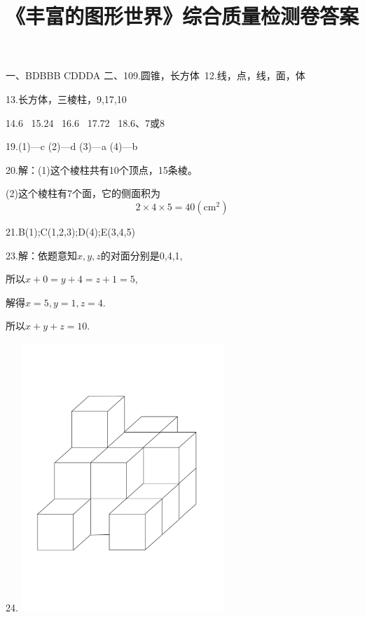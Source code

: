 \documentclass{beamer}
\begin{document}
\begin{frame}
\title{《丰富的图形世界》综合质量检测卷答案}
一、BDBBB  CDDDA
二、109.圆锥，长方体\ 
12.线，点，线，面，体

13.长方体，三棱柱，9,17,10

14.6 \ 15.24 \ 16.6 \ 17.72  \ 18.6、7或8

19.(1)---c (2)---d (3)---a (4)---b

20.解：(1)这个棱柱共有10个顶点，15条棱。

(2)这个棱柱有7个面，它的侧面积为\[2\times4\times5=40(\mathrm{cm}^2)\]

21.B(1);C(1,2,3);D(4);E(3,4,5)
\end{frame}


\begin{frame}
23.解：依题意知$x,y,z$的对面分别是0,4,1,

所以$x+0=y+4=z+1=5$,

解得$x=5,y=1,z=4$.

所以$x+y+z=10$.
\end{frame}


\begin{frame}
24.
\includegraphics[width=3in]{200cm.pdf}
\end{frame}
\end{document}
